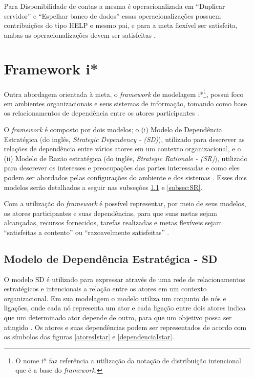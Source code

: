 Para Disponibilidade de contas a mesma é operacionalizada em “Duplicar servidor” e “Espelhar banco de dados” essas operacionalizações possuem contribuições do tipo HELP e mesmo pai, e para a meta flexível ser satisfeita, ambas as operacionalizações devem ser satisfeitas \cite{affleck2012supporting}. 


\section{Framework i*}
\label{sec:i*}


Outra abordagem orientada à meta, o \textit{framework} de modelagem i*\footnote[1]{O nome i* faz referência a utilização da notação de distribuição intencional que é a base do \textit{framework}.}, possui foco em ambientes organizacionais e seus sistemas de informação, tomando como base os relacionamentos de dependência entre os atores participantes \cite{yu1997towards} \cite{istarwiki20}. 

O \textit{framework} é composto por dois modelos; o (i) Modelo de Dependência Estratégica (do inglês, \textit{Strategic Dependency - (SD)}), utilizado para descrever as relações de dependência entre vários atores em um contexto organizacional, e o (ii) Modelo de Razão estratégica (do inglês, \textit{Strategic Rationale - (SR)}), utilizado para descrever os interesses e preocupações das partes interessadas e como eles podem ser abordados pelas configurações do ambiente e dos sistemas \cite{yu1997towards}. Esses dois modelos serão detalhados a seguir nas subseções \ref{subsec:SD} e \ref{subsec:SR}.

Com a utilização do \textit{framework} é possível representar, por meio de seus modelos, os atores participantes e suas dependências, para que suas metas sejam alcançadas, recursos fornecidos, tarefas realizadas e metas flexíveis sejam “satisfeitas a contento” ou “razoavelmente satisfeitas” \cite{istarwiki20}.
 
 
\subsection{Modelo de Dependência Estratégica - SD}
\label{subsec:SD}

O modelo SD é utilizado para expressar através de uma rede de relacionamentos estratégicos e intencionais a relação entre os atores em um contexto organizacional. Em sua modelagem o modelo utiliza um conjunto de nós e ligações, onde cada nó representa um ator e cada ligação entre dois atores indica que um determinado ator depende de outro, para que um objetivo possa ser atingido \cite{istarwiki20}. Os atores e suas dependências podem ser representados de acordo com os símbolos das figuras  \ref{atoresIstar} e \ref{dependenciaIstar}.

